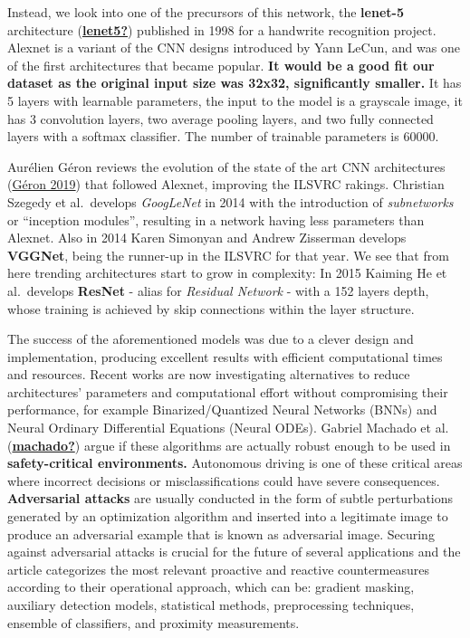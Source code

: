 \documentclass[
  11pt,
]{article}
\begin{document}
Instead, we look into one of the precursors of this network, the
\textbf{lenet-5} architecture
(\protect\hyperlink{ref-lenet5}{\textbf{lenet5?}}) published in 1998 for
a handwrite recognition project. Alexnet is a variant of the CNN designs
introduced by Yann LeCun, and was one of the first architectures that
became popular. \textbf{It would be a good fit our dataset as the
original input size was 32x32, significantly smaller.} It has 5 layers
with learnable parameters, the input to the model is a grayscale image,
it has 3 convolution layers, two average pooling layers, and two fully
connected layers with a softmax classifier. The number of trainable
parameters is 60000.

Aurélien Géron reviews the evolution of the state of the art CNN
architectures (\protect\hyperlink{ref-geron01}{Géron 2019}) that
followed Alexnet, improving the ILSVRC rakings. Christian Szegedy et
al.~develops \emph{GoogLeNet} in 2014 with the introduction of
\emph{subnetworks} or ``inception modules'', resulting in a network
having less parameters than Alexnet. Also in 2014 Karen Simonyan and
Andrew Zisserman develops \textbf{VGGNet}, being the runner-up in the
ILSVRC for that year. We see that from here trending architectures start
to grow in complexity: In 2015 Kaiming He et al.~develops
\textbf{ResNet} - alias for \emph{Residual Network} - with a 152 layers
depth, whose training is achieved by skip connections within the layer
structure.

The success of the aforementioned models was due to a clever design and
implementation, producing excellent results with efficient computational
times and resources. Recent works are now investigating alternatives to
reduce architectures' parameters and computational effort without
compromising their performance, for example Binarized/Quantized Neural
Networks (BNNs) and Neural Ordinary Differential Equations (Neural
ODEs). Gabriel Machado et al.
(\protect\hyperlink{ref-machado}{\textbf{machado?}}) argue if these
algorithms are actually robust enough to be used in
\textbf{safety-critical environments.} Autonomous driving is one of
these critical areas where incorrect decisions or misclassifications
could have severe consequences. \textbf{Adversarial attacks} are usually
conducted in the form of subtle perturbations generated by an
optimization algorithm and inserted into a legitimate image to produce
an adversarial example that is known as adversarial image. Securing
against adversarial attacks is crucial for the future of several
applications and the article categorizes the most relevant proactive and
reactive countermeasures according to their operational approach, which
can be: gradient masking, auxiliary detection models, statistical
methods, preprocessing techniques, ensemble of classifiers, and
proximity measurements.
\end{document}
